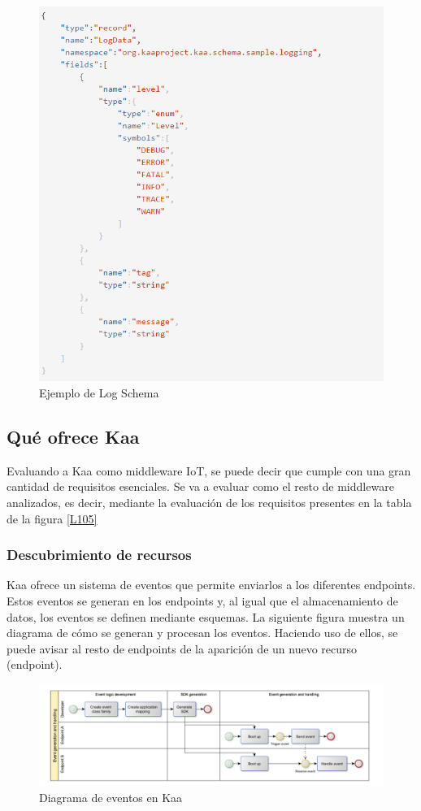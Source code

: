 \documentclass[12pt, twoside]{book}
\begin{document}
\begin{figure}[H]
\centering
\includegraphics[scale=0.5]{images/log_schema_example}
\caption{Ejemplo de Log Schema}\label{L504}
\end{figure} 
\subsection{Qué ofrece Kaa}
Evaluando a Kaa como middleware IoT, se puede decir que cumple con una gran cantidad de requisitos esenciales. Se va a evaluar como el resto de middleware analizados, es decir, mediante la evaluación de los requisitos presentes en la tabla de la figura \ref{L105} 
 

\subsubsection*{Descubrimiento de recursos}
Kaa ofrece un sistema de eventos que permite enviarlos a los diferentes endpoints. Estos eventos se generan en los endpoints y, al igual que el almacenamiento de datos, los eventos se definen mediante esquemas. La siguiente figura muestra un diagrama de cómo se generan y procesan los eventos. Haciendo uso de ellos, se puede avisar al resto de endpoints de la aparición de un nuevo recurso (endpoint).
\begin{figure}[H]
\centering
\includegraphics[scale=0.5]{images/events_schema}
\caption{Diagrama de eventos en Kaa}\label{L506}
\end{figure} 
\end{document}
